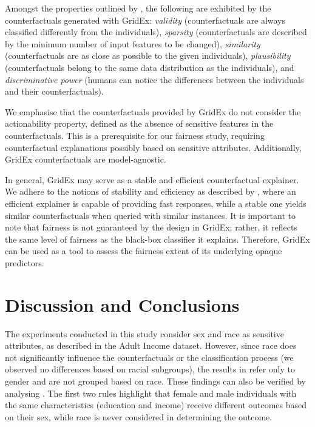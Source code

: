 \documentclass[letterpaper]{article} %
\begin{document}
Amongst the properties outlined by \citet{guidotti2022counterfactual}, the following are exhibited by the counterfactuals generated with GridEx: \textit{validity} (counterfactuals are always classified differently from the individuals), \textit{sparsity} (counterfactuals are described by the minimum number of input features to be changed), \textit{similarity} (counterfactuals are as close as possible to the given individuals), \textit{plausibility} (counterfactuals belong to the same data distribution as the individuals), and \textit{discriminative power} (humans can notice the differences between the individuals and their counterfactuals).%

We emphasise that the counterfactuals provided by GridEx do not consider the actionability property, defined as the absence of sensitive features in the counterfactuals. This is a prerequisite for our fairness study, requiring counterfactual explanations possibly based on sensitive attributes. Additionally, GridEx counterfactuals are model-agnostic.

In general, GridEx may serve as a stable and efficient counterfactual explainer. We adhere to the notions of stability and efficiency as described by \citet{guidotti2022counterfactual}, where an efficient explainer is capable of providing fast responses, while a stable one yields similar counterfactuals when queried with similar instances.
%
It is important to note that fairness is not guaranteed by the design in GridEx; rather, it reflects the same level of fairness as the black-box classifier it explains. Therefore, GridEx can be used as a tool to assess the fairness extent of its underlying opaque predictors.

\section{Discussion and Conclusions}
%
The experiments conducted in this study consider sex and race as sensitive attributes, as described in the Adult Income dataset. However, since race does not significantly influence the counterfactuals or the classification process (we observed no differences based on racial subgroups), the results in  refer only to gender and are not grouped based on race. These findings can also be verified by analysing . The first two rules highlight that female and male individuals with the same characteristics (education and income) receive different outcomes based on their sex, while race is never considered in determining the outcome.
\end{document}
